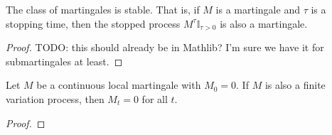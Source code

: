 \begin{lemma}\label{lem:stable_IsMartingale}
  \leanok
The class of martingales is stable. That is, if $M$ is a martingale and $\tau$ is a stopping time, then the stopped process $M^{\tau}\mathbb{I}_{\tau > 0}$ is also a martingale.
\end{lemma}

\begin{proof}
TODO: this should already be in Mathlib? I'm sure we have it for submartingales at least.
\end{proof}


\begin{theorem}\label{thm:IsLocalMartingale.eq_zero_of_finiteVariation}
Let $M$ be a continuous local martingale with $M_0 = 0$. If $M$ is also a finite variation process, then $M_t = 0$ for all $t$.
\end{theorem}

\begin{proof}

\end{proof}
